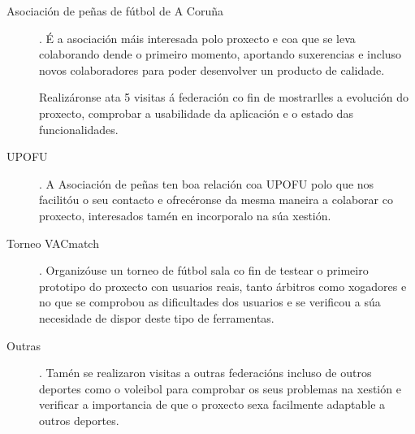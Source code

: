   \begin{description}

  \item [Asociación de peñas de fútbol de A Coruña].
  É a asociación máis interesada polo proxecto e coa que se leva colaborando 
dende o primeiro momento, aportando suxerencias e incluso novos colaboradores 
para poder desenvolver un producto de calidade.

  Realizáronse ata 5 visitas á federación co fin de mostrarlles a evolución do 
proxecto, comprobar a usabilidade da aplicación e o estado das funcionalidades.

  \item [UPOFU].
  A Asociación de peñas ten boa relación coa UPOFU polo que nos facilitóu o seu 
contacto e ofrecéronse da mesma maneira a colaborar co proxecto, interesados 
tamén en incorporalo na súa xestión.

  \item [Torneo VACmatch].
  Organizóuse un torneo de fútbol sala co fin de testear o primeiro prototipo 
do proxecto con usuarios reais, tanto árbitros como xogadores e no que se 
comprobou as dificultades dos usuarios e se verificou a súa necesidade de 
dispor deste tipo de ferramentas.

  \item [Outras].
  Tamén se realizaron visitas a outras federacións incluso de outros deportes 
como o voleibol para comprobar os seus problemas na xestión e verificar a 
importancia de que o proxecto sexa facilmente adaptable a outros deportes.

  \end{description}

